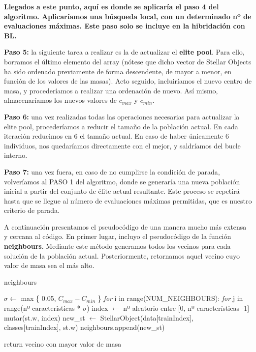 \documentclass[10pt, a4paper]{article}
\theoremstyle{theorem-style}
\theoremstyle{theorem-style}
\theoremstyle{theorem2-style}
\theoremstyle{definition-style}
\theoremstyle{remark-style}
\theoremstyle{example-style}
\theoremstyle{definition-style}
\theoremstyle{remark-style}
\theoremstyle{remark-style}
\begin{document}
\textbf{Llegados a este punto, aquí es donde se aplicaría el paso 4 del algoritmo. Aplicaríamos una búsqueda local, con un determinado nº de evaluaciones máximas. Este paso solo se incluye en la hibridación con BL.}

\textbf{Paso 5: } la siguiente tarea a realizar es la de actualizar el \textbf{elite pool}. Para ello, borramos el último elemento del array (nótese que dicho vector de Stellar Objects ha sido ordenado previamente de forma descendente, de mayor a menor, en función de los valores de las masas). Acto seguido, incluiríamos el nuevo centro de masa, y procederíamos a realizar una ordenación de nuevo. Así mismo, almacenaríamos los nuevos valores de $c_{max}$ y $c_{min}$. 

\textbf{Paso 6: } una vez realizadas todas las operaciones necesarias para actualizar la elite pool, procederíamos a reducir el tamaño de la población actual. En cada iteración reducimos en 6 el tamaño actual. En caso de haber únicamente 6 individuos, nos quedaríamos directamente con el mejor, y saldríamos del bucle interno. 

\textbf{Paso 7: } una vez fuera, en caso de no cumplirse la condición de parada, volveríamos al PASO 1 del algoritmo, donde se generaría una nueva población inicial a partir del conjunto de élite actual resultante. Este proceso se repetirá hasta que se llegue al número de evaluaciones máximas permitidas, que es nuestro criterio de parada. 

A continuación presentamos el pseudocódigo de una manera mucho más extensa y cercana al código. En primer lugar, incluyo el pseudocódigo de la función \textbf{neighbours}. Mediante este método generamos todos los vecinos para cada solución de la población actual. Posteriormente, retornamos aquel vecino cuyo valor de masa sea el más alto. 

\vspace{1cm}

\begin{algorithm}
\caption{neighbours}\label{euclid}
\begin{algorithmic}[1]
\State $\sigma \gets$ max \{ 0.05, $C_{max} - C_{min}$ \}
\State \emph{for} i in range(NUM\_NEIGHBOURS): 
\State \hspace{1cm}\emph{for} j in range(nº caracteristicas * $\sigma$)
\State \hspace{1.5cm} index $\gets$ nº aleatorio entre [0, nº características -1]
\State \hspace{1.5cm} mutar(st.w, index)
\State \hspace{1cm}new\_st $\gets$ StellarObject(data[trainIndex], classes[trainIndex], st.w)
\State \hspace{1cm}neighbours.append(new\_st)

\State
\State return vecino con mayor valor de masa

\EndProcedure
\end{algorithmic}
\end{algorithm}
\end{document}
